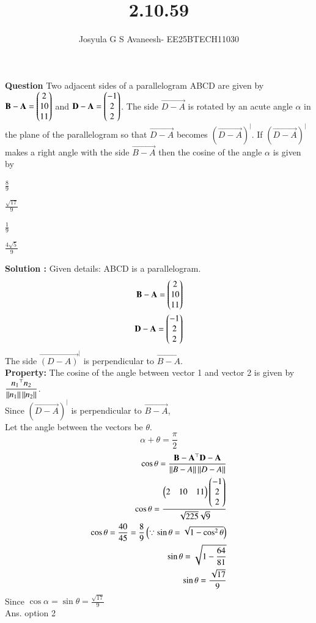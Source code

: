 \documentclass[journal]{IEEEtran}
\theoremstyle{remark}
\begin{document}

\onecolumn

\title{2.10.59}
\author{Josyula G S Avaneesh- EE25BTECH11030}
\maketitle


\renewcommand{\thefigure}{\theenumi}
\renewcommand{\thetable}{\theenumi}
\textbf{Question} Two adjacent sides of a parallelogram ABCD are given by $\mathbf{B-A}=\begin{pmatrix}2\\10\\11\end{pmatrix}$ and $\mathbf{D-A}=\begin{pmatrix}-1\\2\\2\end{pmatrix}$. The side $\vec{D-A}$ is rotated by an acute angle $\alpha$ in the plane of the parallelogram so that $\vec{D-A}$ becomes $(\vec{D-A})^|$. If $(\vec{D-A})^|$ makes a right angle with the side $\vec{B-A}$ then the cosine of the angle $\alpha$ is given by\\
\begin{enumerate}
\begin{multicols}{2}
    \item $\frac{8}{9}$
    \item $\frac{\sqrt{17}}{9}$
    \item $\frac{1}{9}$
    \item $\frac{4 \sqrt{5}}{9}$
\end{multicols}
\end{enumerate}
\textbf{Solution :} Given details:
ABCD is a parallelogram.
\begin{align}
   \mathbf{B-A}=\begin{pmatrix}2\\10\\11\end{pmatrix}\\
   \mathbf{D-A}=\begin{pmatrix}-1\\2\\2\end{pmatrix}
\end{align}
The side $\vec{(D-A)}^|$ is perpendicular to $\vec{B-A}$.\\
\textbf{Property:} The cosine of the angle between vector 1 and vector 2 is given by $\dfrac{{n_1}^\top n_2}{\left\lVert n_1\right\rVert\left\lVert n_2\right\rVert} $.\\
Since $(\vec{D-A})^|$ is perpendicular to $\vec{B-A}$,\\


Let the angle between the vectors be $\theta$.
$$\alpha+\theta=\frac{\pi}{2}$$
\begin{align}
  \cos\theta=\frac{\mathbf{B-A}^\top\mathbf{D-A}}{\left\lVert B-A\right\rVert\left\lVert D-A\right\rVert}\\
  \cos\theta=\frac{\begin{pmatrix}2&10&11\end{pmatrix}\begin{pmatrix}-1\\2\\2\end{pmatrix}}{\sqrt{225}\sqrt{9}}\\
  \cos\theta=\frac{40}{45}=\frac{8}{9}\left(\because\sin\theta=\sqrt{1-\cos^2\theta}\right)\\
  \sin\theta=\sqrt{1-\frac{64}{81}}\\
  \sin\theta=\frac{\sqrt{17}}{9}
\end{align}
Since $\cos\alpha=\sin\theta=\frac{\sqrt{17}}{9}$\\
Ans. option 2
\end{document}
